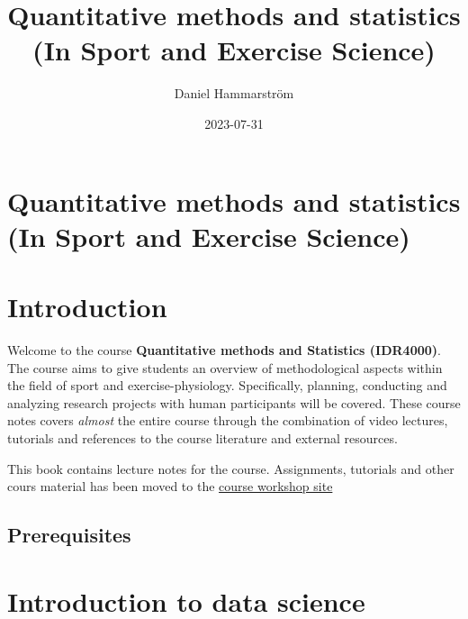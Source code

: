 \documentclass[
  11pt,
  letterpaper,
]{scrbook}
\title{Quantitative methods and statistics (In Sport and Exercise
Science)}
\author{Daniel Hammarström}
\date{2023-07-31}
\renewcommand*\contentsname{Table of contents}
\newcommand\contentsname{Table of contents}
\begin{document}
\frontmatter
\maketitle
\ifdefined\Shaded\renewenvironment{Shaded}{\begin{tcolorbox}[interior hidden, borderline west={3pt}{0pt}{shadecolor}, enhanced, breakable, frame hidden, sharp corners, boxrule=0pt]}{\end{tcolorbox}}\fi

\renewcommand*\contentsname{Table of contents}
{
\setcounter{tocdepth}{2}
\tableofcontents
}
\mainmatter
{}

\hypertarget{quantitative-methods-and-statistics-in-sport-and-exercise-science}{%
\chapter{Quantitative methods and statistics (In Sport and Exercise
Science)}\label{quantitative-methods-and-statistics-in-sport-and-exercise-science}}


\hypertarget{introduction}{%
\chapter{Introduction}\label{introduction}}

Welcome to the course \textbf{Quantitative methods and Statistics
(IDR4000)}. The course aims to give students an overview of
methodological aspects within the field of sport and
exercise-physiology. Specifically, planning, conducting and analyzing
research projects with human participants will be covered. These course
notes covers \emph{almost} the entire course through the combination of
video lectures, tutorials and references to the course literature and
external resources.

This book contains lecture notes for the course. Assignments, tutorials
and other cours material has been moved to the
\href{https://dhammarstrom.github.io/quant-methods-workshops/}{course
workshop site}

\hypertarget{prerequisites}{%
\section{Prerequisites}\label{prerequisites}}


\hypertarget{introduction-to-data-science}{%
\chapter{Introduction to data
science}\label{introduction-to-data-science}}
\end{document}
